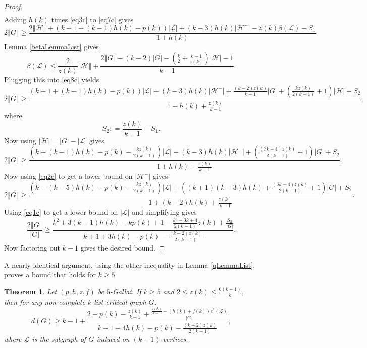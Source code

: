 \documentclass[10pt]{article}
\theoremstyle{plain}
\newtheorem{thm}{Theorem}[section]
\theoremstyle{definition}
\theoremstyle{remark}
\newcommand{\fancy}[1]{\mathcal{#1}}
\renewcommand{\L}{\fancy{L}}
\newcommand{\HH}{\fancy{H}}
\newcommand{\card}[1]{\left|#1\right|}
\newcommand{\size}[1]{\left\Vert#1\right\Vert}
\newcommand{\parens}[1]{\left( #1 \right)}
\newcommand{\DefinedAs}{\mathrel{\mathop:}=}
\begin{document}
\begin{proof}
\begin{align*}
\end{align*}
Adding $h(k)$ times \eqref{eq3c} to \eqref{eq7c} gives
\begin{equation}\label{eq8c}
2\size{G} \ge \frac{2\size{\HH} + \parens{k+1 +(k-1)h(k)- p(k)}\card{\L} + (k- 3)h(k)\card{\HH^-}  - z(k)\beta(\L) - S_1}{1 + h(k)}
\end{equation}
Lemma \ref{betaLemmaList} gives
\[\beta(\L) \le \frac{2}{z(k)}\size{\HH} + \frac{2\size{G} - (k-2)\card{G} - \parens{\frac{k}{2} + \frac{k-1}{z(k)}}\card{\HH} - 1}{k-1}.\]
Plugging this into \eqref{eq8c} yields
\begin{equation}\label{eq9c}
2\size{G} \ge \frac{\parens{k+1 +(k-1)h(k)- p(k)}\card{\L} + (k- 3)h(k)\card{\HH^-} +\frac{(k-2)z(k)}{k-1}\card{G} + \parens{\frac{kz(k)}{2(k-1)} + 1}\card{\HH} + S_2}{1 + h(k) + \frac{z(k)}{k-1}},
\end{equation}
where
\[S_2 \DefinedAs \frac{z(k)}{k-1} - S_1.\]
Now using $\card{\HH} = \card{G} - \card{\L}$ gives
\begin{equation}\label{eq10c}
2\size{G} \ge \frac{\parens{k +(k-1)h(k)- p(k) - \frac{kz(k)}{2(k-1)}}\card{\L} + (k- 3)h(k)\card{\HH^-} + \parens{\frac{(3k-4)z(k)}{2(k-1)} + 1}\card{G} + S_2}{1 + h(k) + \frac{z(k)}{k-1}}.
\end{equation}
Now using \eqref{eq2c} to get a lower bound on $\card{\HH^-}$ gives
\begin{equation}\label{eq11c}
2\size{G} \ge \frac{\parens{k - (k-5)h(k)- p(k) - \frac{kz(k)}{2(k-1)}}\card{\L}+\parens{(k+1)(k-3)h(k) + \frac{(3k-4)z(k)}{2(k-1)} + 1}\card{G} + S_2}{1 + (k-2)h(k) + \frac{z(k)}{k-1}}.
\end{equation}
Using \eqref{eq1c} to get a lower bound on $\card{\L}$ and simplifying gives
\begin{equation}\label{eq12c}
\frac{2\size{G}}{\card{G}} \ge \frac{k^2 + 3(k-1)h(k) - kp(k) + 1 - \frac{k^2-3k+4}{2(k-1)}z(k) + \frac{S_2}{\card{G}}}{k+1 + 3h(k) - p(k) - \frac{(k-2)z(k)}{2(k-1)}}.
\end{equation}
Now factoring out $k-1$ gives the desired bound.
\end{proof}

\noindent A nearly identical argument, using the other inequality in Lemma \ref{qLemmaList}, proves a bound that holds for $k \ge 5$.

\begin{thm}\label{k5}
	Let $\parens{p,h,z,f}$ be $5$-Gallai.  If $k \ge 5$ and $2 \le z(k) \le \frac{6(k-1)}{k}$, then for any non-complete $k$-list-critical graph $G$,
	\[d(G) \ge k-1 + \frac{2 - p(k) - \frac{z(k)}{k-1} + \frac{\frac{z(k)}{k-1} - (h(k) + f(k))c^*(\L)}{\card{G}}}{k+1 + 4h(k) - p(k) - \frac{(k-2)z(k)}{2(k-1)}},\]
	where $\L$ is the subgraph of $G$ induced on $(k-1)$-vertices.
\end{thm}
\end{document}
